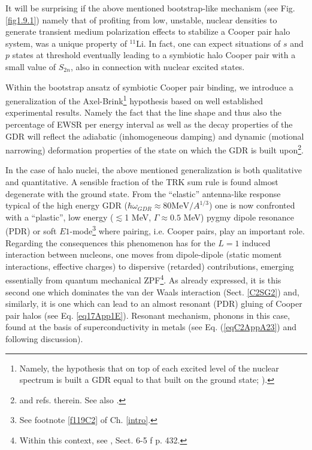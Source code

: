 It will be surprising if the above mentioned  bootstrap-like mechanism 
 (see Fig. \ref{fig1.9.1})  namely that of profiting from  low, unstable, nuclear densities to generate transient medium polarization effects to stabilize a Cooper pair halo system, was a unique property of $^{11}$Li. In fact, one can expect  situations of $s$ and $p$ states at threshold eventually leading to a symbiotic halo Cooper pair with a small value of $S_{2n}$, also in connection with  nuclear excited states. 





 
Within the bootstrap ansatz of symbiotic Cooper pair binding, we introduce a  generalization of the Axel-Brink\footnote{Namely, the hypothesis that on top of each excited level of the nuclear spectrum is built a GDR equal to that built on the ground state; \cite{Axel:62,Brink:55}).} hypothesis based on  well established experimental    results. Namely the fact that the line shape and thus also the percentage of EWSR per energy interval as well as the decay properties of the GDR will reflect the  adiabatic (inhomogeneous damping) and dynamic (motional narrowing) deformation properties of the state on which the GDR is built upon\footnote{\cite{LeTourneaux:65,Bohr:75,Bortignon:98} and refs. therein. See also \cite{Dattagupta:87}.}.

In the case of halo nuclei, the above mentioned generalization is both qualitative and  quantitative. A sensible fraction of the TRK sum rule is found almost degenerate with the ground state. From the ``elastic'' antenna-like response typical of the high energy GDR ($\hbar\omega_{GDR}\approx80\text{MeV}/A^{1/3}$)  one is now confronted with a ``plastic'', low energy ($\lesssim$1 MeV, $\Gamma\approx0.5$ MeV)  pygmy dipole resonance (PDR) or soft $E1$-mode\footnote{See footnote \ref{f119C2} of Ch. \ref{intro}.} where pairing, i.e. Cooper pairs, play an important role. Regarding the consequences this phenomenon has for the $L=1$ induced interaction between nucleons, one moves from dipole-dipole (static moment interactions, effective charges) to dispersive (retarded) contributions, emerging essentially from quantum mechanical ZPF\footnote{Within this context, see \cite{Bohr:75}, Sect. 6-5 f p. 432.}. As already expressed, it is this second one which dominates the van der Waals interaction 
 (Sect. \ref{C2SG2}) and, similarly, it is one which can lead to an almost resonant (PDR) gluing of Cooper pair halos (see Eq. \ref{eq17App1E}). Resonant mechanism, phonons in this case,  found  at the basis of superconductivity in metals (see Eq. (\ref{eqC2AppA23}) and  following discussion). 

